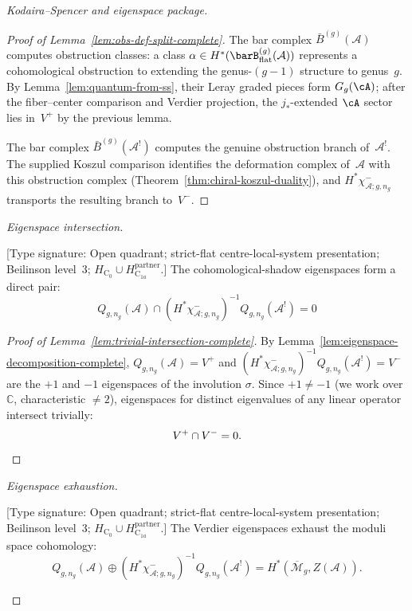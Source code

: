 \begin{proof}[Kodaira--Spencer and eigenspace package]
\begin{proof}[Proof of Lemma~\ref{lem:obs-def-split-complete}]
The bar complex $\bar{B}^{(g)}(\mathcal{A})$ computes obstruction
classes: a class
$\alpha \in H^*(\barB^{(g)}_{\mathrm{flat}}(\mathcal{A}))$
represents a cohomological obstruction to extending the
genus-$(g{-}1)$ structure to genus~$g$. By
Lemma~\ref{lem:quantum-from-ss}, their Leray graded pieces form
$G_g(\cA)$; after the fiber--center comparison and Verdier projection,
the $j_*$-extended $\cA$ sector lies in~$V^+$ by the previous lemma.

The bar complex $\bar{B}^{(g)}(\mathcal{A}^!)$ computes the genuine
obstruction branch of~$\mathcal A^!$.  The supplied Koszul comparison
identifies the deformation complex of~$\mathcal A$ with this obstruction
complex (Theorem~\ref{thm:chiral-koszul-duality}), and
$H^*\chi^-_{\mathcal A;g,n_g}$ transports the resulting branch to~$V^-$.
\end{proof}

\emph{Eigenspace intersection.}

\begin{lemma}
\label{lem:trivial-intersection-complete}
\textup{[Type signature: Open quadrant; strict-flat
centre-local-system presentation; Beilinson level~3;
\(H_{\mathrm C_0}\cup H_{\mathrm C_{1a}}^{\mathrm{partner}}\).]}
The cohomological-shadow eigenspaces form a direct pair:
\begin{equation}
Q_{g,n_g}(\mathcal{A}) \cap
(H^*\chi^-_{\mathcal A;g,n_g})^{-1}Q_{g,n_g}(\mathcal{A}^!) = 0
\end{equation}
\end{lemma}

\begin{proof}[Proof of Lemma~\ref{lem:trivial-intersection-complete}]
By Lemma~\ref{lem:eigenspace-decomposition-complete},
$Q_{g,n_g}(\mathcal{A})=V^+$ and
$(H^*\chi^-_{\mathcal A;g,n_g})^{-1}Q_{g,n_g}(\mathcal{A}^!)=V^-$
are the $+1$ and $-1$ eigenspaces of the involution
$\sigma$. Since $+1 \neq -1$ (we work over $\mathbb{C}$, characteristic $\neq 2$),
eigenspaces for distinct eigenvalues of any linear operator intersect trivially:
\[
V^+ \cap V^- = 0. \qedhere
\]
\end{proof}

\emph{Eigenspace exhaustion.}

\begin{lemma}
\label{lem:exhaustion-complete}
\textup{[Type signature: Open quadrant; strict-flat
centre-local-system presentation; Beilinson level~3;
\(H_{\mathrm C_0}\cup H_{\mathrm C_{1a}}^{\mathrm{partner}}\).]}
The Verdier eigenspaces exhaust the moduli space cohomology:
\begin{equation}
Q_{g,n_g}(\mathcal{A}) \oplus
(H^*\chi^-_{\mathcal A;g,n_g})^{-1}Q_{g,n_g}(\mathcal{A}^!)
= H^*(\overline{\mathcal{M}}_g,Z(\mathcal{A})).
\end{equation}
\end{lemma}


\end{proof}
